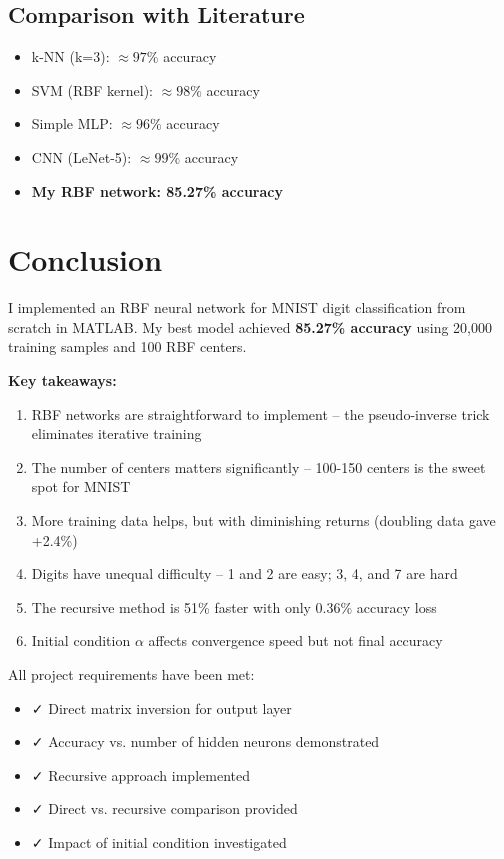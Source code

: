 \documentclass[12pt]{article}
\begin{document}
	\subsection{Comparison with Literature}
	
	\begin{itemize}
		\item k-NN (k=3): $\approx 97\%$ accuracy
		\item SVM (RBF kernel): $\approx 98\%$ accuracy
		\item Simple MLP: $\approx 96\%$ accuracy
		\item CNN (LeNet-5): $\approx 99\%$ accuracy
		\item \textbf{My RBF network: 85.27\% accuracy}
	\end{itemize}
	
	\section{Conclusion}
	
	I implemented an RBF neural network for MNIST digit classification from scratch in MATLAB. My best model achieved \textbf{85.27\% accuracy} using 20,000 training samples and 100 RBF centers.
	
	\textbf{Key takeaways:}
	
	\begin{enumerate}
		\item RBF networks are straightforward to implement – the pseudo-inverse trick eliminates iterative training
		\item The number of centers matters significantly – 100-150 centers is the sweet spot for MNIST
		\item More training data helps, but with diminishing returns (doubling data gave +2.4\%)
		\item Digits have unequal difficulty – 1 and 2 are easy; 3, 4, and 7 are hard
		\item The recursive method is 51\% faster with only 0.36\% accuracy loss
		\item Initial condition $\alpha$ affects convergence speed but not final accuracy
	\end{enumerate}
	
	All project requirements have been met:
	\begin{itemize}
		\item ✓ Direct matrix inversion for output layer
		\item ✓ Accuracy vs. number of hidden neurons demonstrated
		\item ✓ Recursive approach implemented
		\item ✓ Direct vs. recursive comparison provided
		\item ✓ Impact of initial condition investigated
	\end{itemize}
	
\end{document}
